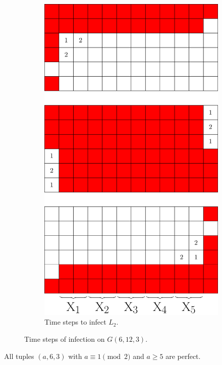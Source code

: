 \begin{figure}[]
\begin{subfigure}{0.2915\textwidth}
\includegraphics[width=\textwidth]{figures/7/6x12x3_L2_numbered_heatmap.pdf}
\caption{Time steps to infect $L_2$.}
\label{fig:6x12x3_timesteps}
\end{subfigure}
\caption{Time steps of infection on $G(6,12,3)$.}
\label{fig:}
\end{figure} 

\begin{con}
\label{con:3x6xodd}
All tuples $(a,6,3)$ with $a \equiv 1 \pmod 2$ and $a \geq 5$ are perfect. 
\end{con}

